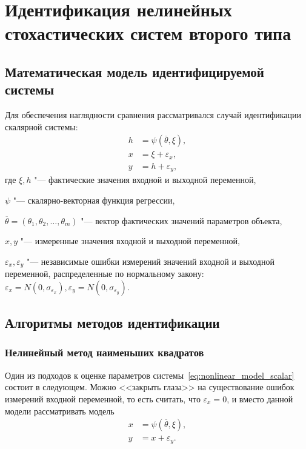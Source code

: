 \chapter[Идентификация нелинейных стохастических систем второго типа]{%
  Идентификация нелинейных стохастических систем второго типа
}

\section{Математическая модель идентифицируемой системы}

Для обеспечения наглядности сравнения рассматривался случай идентификации скалярной системы:
\begin{equation}
  \label{eq:nonlinear_model_scalar}
  \begin{aligned}
  h &= \psi(\overline{\theta}, \xi), \\
  x &= \xi + \varepsilon_x, \\
  y &= h + \varepsilon_y,
  \end{aligned}
\end{equation}
где \( \xi, h \) "--- фактические значения входной и выходной переменной, \par
\( \psi \) "--- скалярно-векторная функция регрессии, \par
\(
\overline{\theta} = (\theta_1, \theta_2, \dotsc, \theta_m)
\) "--- вектор фактических значений параметров объекта, \par
\( x, y \) "--- измеренные значения входной и выходной переменной, \par
\( \varepsilon_x, \varepsilon_y \) "--- независимые ошибки измерений значений входной и
выходной переменной, распределенные по нормальному закону:
\(
\varepsilon_x = N(0, \sigma_{\varepsilon_x}),
\varepsilon_y = N(0, \sigma_{\varepsilon_y})
\).

\section{Алгоритмы методов идентификации}

\subsection{Нелинейный метод наименьших квадратов}

Один из подходов к оценке параметров системы~\eqref{eq:nonlinear_model_scalar} состоит в следующем.
Можно <<закрыть глаза>> на существование ошибок измерений
входной переменной, то есть считать, что \( \varepsilon_x = 0 \),
и вместо данной модели рассматривать модель
\begin{equation}
  \label{eq:nonlinear_model_lse}
  \begin{aligned}
  x &= \psi(\overline{\theta}, \xi), \\
  y &= x + \varepsilon_y.
  \end{aligned}
\end{equation}

